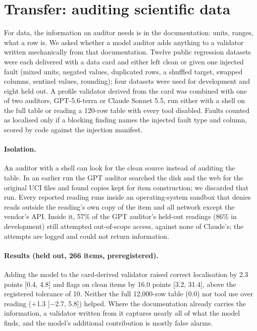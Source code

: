 \section{Transfer: auditing scientific data}
\label{sec:data}

For data, the information an auditor needs is in the documentation: units, ranges, what a row is. We asked whether a
model auditor adds anything to a validator written mechanically from that documentation. Twelve public regression
datasets were each delivered with a data card and either left clean or given one injected fault (mixed units,
negated values, duplicated rows, a shuffled target, swapped columns, sentinel values, rounding); four datasets were used for
development and eight held out. A profile validator derived from the card was combined with one of two auditors,
GPT-5.6-terra or Claude Sonnet 5.5, run either with a shell on the full table or reading a 120-row table with every
tool disabled. Faults counted as localised only if a blocking finding names the injected fault type and column,
scored by code against the injection manifest.

\paragraph{Isolation.} An auditor with a shell can look for the clean source instead of auditing the table. In an
earlier run the GPT auditor searched the disk and the web for the original UCI files and found copies kept for item
construction; we discarded that run. Every reported reading runs inside an operating-system sandbox that denies reads
outside the reading's own copy of the item and all network except the vendor's API. Inside it, 57\% of the GPT
auditor's held-out readings (86\% in development) still attempted out-of-scope access, against none of Claude's; the
attempts are logged and could not return information.

\paragraph{Results (held out, 266 items, preregistered).} Adding the model to the card-derived validator raised
correct localisation by 2.3 points [0.4, 4.8] and flags on clean items by 16.0 points [3.2, 31.4], above the
registered tolerance of 10. Neither the full 12{,}000-row table (0.0) nor tool use over reading (+1.3 [$-$2.7, 5.8])
helped. Where the documentation already carries the information, a validator written from it captures nearly all of
what the model finds, and the model's additional contribution is mostly false alarms.
